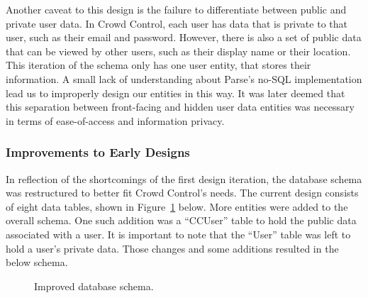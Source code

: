 Another caveat to this design is the failure to differentiate between public and private user data. In Crowd Control, each user has data that is private to that user, such as their email and password. However, there is also a set of public data that can be viewed by other users, such as their display name or their location. This iteration of the schema only has one user entity, that stores their information. A small lack of understanding about Parse's no-SQL implementation lead us to improperly design our entities in this way. It was later deemed that this separation between front-facing and hidden user data entities was necessary in terms of ease-of-access and information privacy.

\subsubsection{Improvements to Early Designs}
In reflection of the shortcomings of the first design iteration, the database schema was restructured to better fit Crowd Control's needs. The current design consists of eight data tables,  shown in Figure~\ref{MidDBSchema} below. More entities were added to the overall schema. One such addition was a ``CCUser'' table to hold the public data associated with a user. It is important to note that the ``User'' table was left to hold a user's private data. Those changes and some additions resulted in the below schema. 

	\begin{figure}[tbh]
	\begin{center}
	\end{center}
	\caption{Improved database schema. \label{MidDBSchema}}
	\end{figure}

